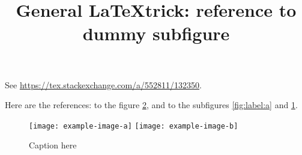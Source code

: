 \documentclass{goose-article}
\title{General \LaTeX trick: reference to dummy subfigure}
\author{}
\begin{document}
\maketitle

See \url{https://tex.stackexchange.com/a/552811/132350}.

Here are the references:
to the figure \cref{fig:label}, and to the subfigures \cref{fig:label:a} and \cref{fig:label:b}.

\begin{figure}[htp]
    \centering
    \begin{subfigure}{\textwidth} %
        \label{fig:label:a}
        \label{fig:label:b}
    \end{subfigure}%
    \texttt{[image: example-image-a]}
    \hspace{.02\textwidth}
    \texttt{[image: example-image-b]}
    \caption{Caption here}
    \label{fig:label}
\end{figure}
\end{document}
